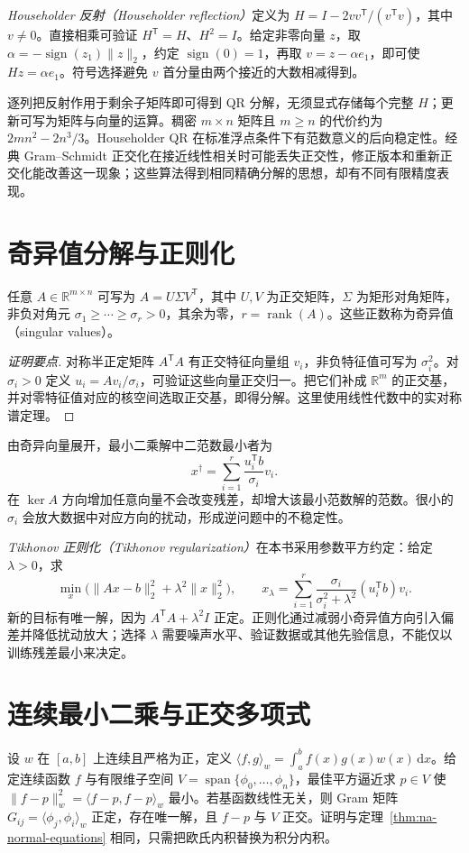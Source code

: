 \documentclass[UTF8,12pt,a4paper,fontset=fandol]{ctexbook}
\begin{document}
\emph{Householder 反射（Householder reflection）}定义为 $H=I-2vv^{\mathsf T}/(v^{\mathsf T}v)$，其中 $v\ne0$。直接相乘可验证 $H^{\mathsf T}=H$、$H^2=I$。给定非零向量 $z$，取 $\alpha=-\operatorname{sign}(z_1)\|z\|_2$，约定 $\operatorname{sign}(0)=1$，再取 $v=z-\alpha e_1$，即可使 $Hz=\alpha e_1$。符号选择避免 $v$ 首分量由两个接近的大数相减得到。

逐列把反射作用于剩余子矩阵即可得到 QR 分解，无须显式存储每个完整 $H$；更新可写为矩阵与向量的运算。稠密 $m\times n$ 矩阵且 $m\ge n$ 的代价约为 $2mn^2-2n^3/3$。Householder QR 在标准浮点条件下有范数意义的后向稳定性。经典 Gram--Schmidt 正交化在接近线性相关时可能丢失正交性，修正版本和重新正交化能改善这一现象；这些算法得到相同精确分解的思想，却有不同有限精度表现。

\section{奇异值分解与正则化}
\begin{theorem}[奇异值分解的基本形式]
任意 $A\in\mathbb R^{m\times n}$ 可写为 $A=U\Sigma V^{\mathsf T}$，其中 $U,V$ 为正交矩阵，$\Sigma$ 为矩形对角矩阵，非负对角元 $\sigma_1\ge\cdots\ge\sigma_r>0$，其余为零，$r=\operatorname{rank}(A)$。这些正数称为奇异值（singular values）。
\end{theorem}
\begin{proof}[证明要点]
对称半正定矩阵 $A^{\mathsf T}A$ 有正交特征向量组 $v_i$，非负特征值可写为 $\sigma_i^2$。对 $\sigma_i>0$ 定义 $u_i=Av_i/\sigma_i$，可验证这些向量正交归一。把它们补成 $\mathbb R^m$ 的正交基，并对零特征值对应的核空间选取正交基，即得分解。这里使用线性代数中的实对称谱定理。
\end{proof}

由奇异向量展开，最小二乘解中二范数最小者为
\[
 x^\dagger=\sum_{i=1}^r\frac{u_i^{\mathsf T}b}{\sigma_i}v_i.
\]
在 $\ker A$ 方向增加任意向量不会改变残差，却增大该最小范数解的范数。很小的 $\sigma_i$ 会放大数据中对应方向的扰动，形成逆问题中的不稳定性。

\emph{Tikhonov 正则化（Tikhonov regularization）}在本书采用参数平方约定：给定 $\lambda>0$，求
\[
 \min_x\bigl(\|Ax-b\|_2^2+\lambda^2\|x\|_2^2\bigr),\qquad
 x_\lambda=\sum_{i=1}^r\frac{\sigma_i}{\sigma_i^2+\lambda^2}(u_i^{\mathsf T}b)v_i.
\]
新的目标有唯一解，因为 $A^{\mathsf T}A+\lambda^2I$ 正定。正则化通过减弱小奇异值方向引入偏差并降低扰动放大；选择 $\lambda$ 需要噪声水平、验证数据或其他先验信息，不能仅以训练残差最小来决定。

\section{连续最小二乘与正交多项式}
设 $w$ 在 $[a,b]$ 上连续且严格为正，定义 $\langle f,g\rangle_w=\int_a^b f(x)g(x)w(x)\,\mathrm dx$。给定连续函数 $f$ 与有限维子空间 $V=\operatorname{span}\{\phi_0,\ldots,\phi_n\}$，最佳平方逼近求 $p\in V$ 使 $\|f-p\|_w^2=\langle f-p,f-p\rangle_w$ 最小。若基函数线性无关，则 Gram 矩阵 $G_{ij}=\langle\phi_j,\phi_i\rangle_w$ 正定，存在唯一解，且 $f-p$ 与 $V$ 正交。证明与定理~\ref{thm:na-normal-equations} 相同，只需把欧氏内积替换为积分内积。
\end{document}
